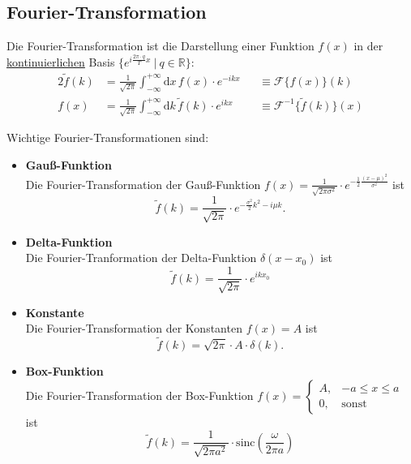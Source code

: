 \documentclass{article}
\newcommand{\diff}{\mathrm{d}}
\newcommand{\lr}[1]{\left(#1\right)}
\begin{document}
\newpage


\subsection{Fourier-Transformation}
Die Fourier-Transformation ist die Darstellung einer Funktion $f(x)$ in der \underline{kontinuierlichen} Basis $\{ e^{i \frac{2\pi \cdot q}{T} x} \ | \ q \in \mathbb{R} \}$:
	\begin{alignat}{2}
		\tilde{f}(k) &= \frac{1}{\sqrt{2\pi}} \int_{-\infty}^{+\infty} \diff x \, f(x) \cdot e^{-i k x} &&\equiv \mathcal{F}\{ f(x) \}(k) \\
		f(x) &= \frac{1}{\sqrt{2\pi}} \int_{-\infty}^{+\infty} \diff k \, \tilde{f}(k) \cdot e^{i k x} &&\equiv \mathcal{F}^{-1}\{ \tilde{f}(k) \}(x)
	\end{alignat}

Wichtige Fourier-Transformationen sind:
	\begin{itemize}
		\item \textbf{Gauß-Funktion}\\
		Die Fourier-Transformation der Gauß-Funktion $f(x) = \frac{1}{\sqrt{2 \pi \sigma^2}} \cdot e^{-\frac{1}{2} \frac{(x - \mu)^2}{\sigma^2}}$ ist
			\begin{equation}
				\tilde{f}(k) = \frac{1}{\sqrt{2 \pi}} \cdot e^{- \frac{\sigma^2}{2} k^2 - i \mu k}.
			\end{equation}


		\item \textbf{Delta-Funktion}\\
		Die Fourier-Tranformation der Delta-Funktion $\delta(x-x_0)$ ist
			\begin{equation}
				\tilde{f}(k) = \frac{1}{\sqrt{2\pi}} \cdot e^{ikx_0}
			\end{equation}
		
		
		\item \textbf{Konstante}\\
		Die Fourier-Transformation der Konstanten $f(x) = A$ ist
			\begin{equation}
				\tilde{f}(k) = \sqrt{2\pi} \cdot A \cdot \delta(k).
			\end{equation}
		
		
		\item \textbf{Box-Funktion}\\
		Die Fourier-Transformation der Box-Funktion
		$f(x) = 
		\begin{cases}
			A, & -a \leq x \leq a \\
			0, & \text{sonst}
		\end{cases}$
		ist
			\begin{equation}
				\tilde{f}(k) = \frac{1}{\sqrt{2\pi a^2}} \cdot \text{sinc} \lr{ \frac{\omega}{2\pi a} }
			\end{equation}
	\end{itemize}
\end{document}
